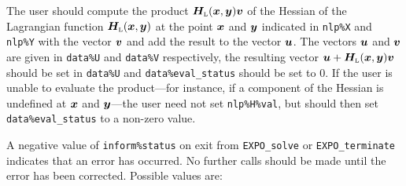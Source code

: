 \documentclass{galahad}
\newcommand{\packagename}{EXPO}
\newcommand{\bmHL}{\bmH\sub{L}}
\begin{document}
\begin{description}
 The user should compute the product $\bmHL(\bmx,\bmy) \bmv$ of the 
     Hessian of the Lagrangian function $\bmHL(\bmx,\bmy)$ at the point 
     ${\bm{x}}$ and ${\bm{y}}$ indicated in {\tt nlp\%X}  and {\tt nlp\%Y} with the 
     vector ${\bm{v}}$ and add the result to
     the vector ${\bm{u}}$. The vectors ${\bm{u}}$ and ${\bm{v}}$ are given in
     {\tt data\%U} and {\tt data\%V} respectively, the resulting
     vector $\bmu + \bmHL(\bmx,\bmy)\bmv$ should be set in {\tt data\%U}
     and  {\tt data\%eval\_status} should be set to 0. If the user is
     unable to evaluate the product---for instance, if a component of the 
     Hessian is undefined at ${\bm{x}}$ and ${\bm{y}}$---the user need not set 
    {\tt nlp\%H\%val}, but should then set {\tt data\%eval\_status} to a 
    non-zero value.
\end{description}



\galerrors
A negative value of {\tt inform\%status} on exit from
{\tt \packagename\_solve}
or
{\tt \packagename\_terminate}
indicates that an error has occurred. No further calls should be made
until the error has been corrected. Possible values are:
\end{document}

